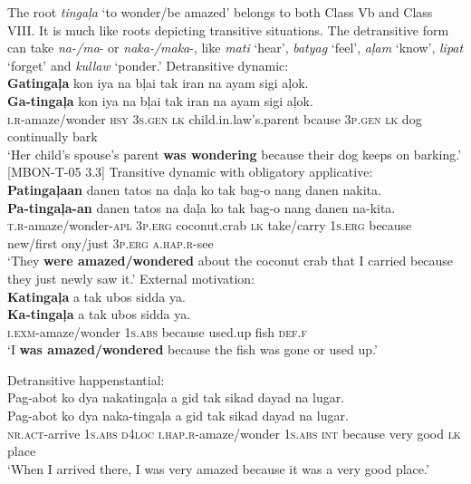 The root \textit{tingaļa} ‘to wonder/be amazed’ belongs to both Class Vb and Class VIII. It is much like roots depicting transitive situations. The detransitive form can take \textit{na-/ma}- or \textit{naka-/maka}-, like \textit{mati} `hear', \textit{batyag} `feel', \textit{aļam} `know', \textit{lipat} `forget' and \textit{kullaw} `ponder.'
\ea
Detransitive dynamic: \\
\textbf{Gatingaļa}  kon  iya  na  bļai  tak  iran  na  ayam sigi  aļok. \\\smallskip
\gll \textbf{Ga-tingaļa}  kon  iya  na  bļai  tak  iran  na  ayam sigi  aļok. \\
\textsc{i.r}-amaze/wonder  \textsc{hsy}  3\textsc{s.gen}  \textsc{lk}  child.in.law’s.parent  bcause  3\textsc{p.gen}  \textsc{lk}  dog  continually bark \\
\glt `Her child’s spouse’s parent \textbf{was wondering} because their dog keeps on barking.’ [MBON-T-05 3.3]
\z
\ea
Transitive dynamic with obligatory applicative: \\
\textbf{Patingaļaan}  danen  tatos  na  daļa  ko  tak bag-o  nang  danen  nakita. \\\smallskip
\gll \textbf{Pa-tingaļa-an}  danen  tatos  na  daļa  ko  tak bag-o  nang  danen  na-kita. \\
\textsc{t.r}-amaze/wonder-\textsc{apl}  3\textsc{p.erg}  coconut.crab  \textsc{lk}  take/carry  1\textsc{s.erg}  because
new/first  ony/just  3\textsc{p.erg}  \textsc{a.hap.r}-see \\
\glt `They \textbf{were amazed/wondered} about the coconut crab that I carried because they just newly saw it.’
\z
\ea
External motivation: \\
\textbf{Katingaļa}  a  tak  ubos  sidda  ya. \\\smallskip
\gll \textbf{Ka-tingaļa}  a  tak  ubos  sidda  ya. \\
\textsc{i.exm}-amaze/wonder  1\textsc{s.abs}  because  used.up  fish  \textsc{def.f} \\
\glt ‘I \textbf{was amazed/wondered} because the fish was gone or used up.’
\z

\newpage
\ea
Detransitive happenstantial: \\
Pag-abot	ko	dya	nakatingaļa	a	gid	tak	sikad dayad	na	lugar. \\\smallskip
\gll Pag-abot	ko	dya	naka-tingaļa	a	gid	tak	sikad dayad	na	lugar. \\
\textsc{nr.act}-arrive	1\textsc{s.abs}	\textsc{d4loc}	\textsc{i.hap.r}-amaze/wonder	1\textsc{s.abs}	\textsc{int}	because	very good	\textsc{lk}	place \\
\glt ‘When I arrived there, I was very amazed because it was a very good place.’
\z

